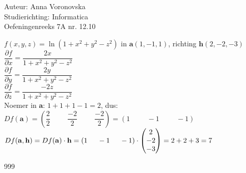 \documentclass[a4paper]{article}
\begin{document}
  
\noindent \large Auteur: Anna Voronovska \\
\noindent \large Studierichting: Informatica\\
\noindent \large Oefeningenreeks 7A nr. 12.10\\

\medskip

\normalsize

$f(x,y,z) = \ln(1+x^2+y^2-z^2)$ in $\mathbf{a}(1,-1,1)$, richting $\mathbf{h}(2,-2,-3)$\\

$\dfrac{\partial f}{\partial x} = \dfrac{2x}{1+x^2+y^2-z^2}$\\

$\dfrac{\partial f}{\partial y} = \dfrac{2y}{1+x^2+y^2-z^2}$\\

$\dfrac{\partial f}{\partial z} = \dfrac{-2z}{1+x^2+y^2-z^2}$\\

Noemer in $\mathbf{a}$: $1+1+1-1=2$, dus:\\

$Df(\mathbf{a}) = \left(\dfrac{2}{2} \hspace{1cm} \dfrac{-2}{2} \hspace{1cm} \dfrac{-2}{2}\right) = \left(1 \hspace{1cm} -1 \hspace{1cm} -1\right)$\\

$Df(\mathbf{a},\mathbf{h}) = Df(\mathbf{a}) \cdot \mathbf{h} = (1 \hspace{0.5cm} -1 \hspace{0.5cm} -1) \cdot \begin{pmatrix} 2 \\ -2 \\ -3 \end{pmatrix} = 2+2+3 = 7$

\begin{thebibliography}{999}
\end{thebibliography}
\end{document}
